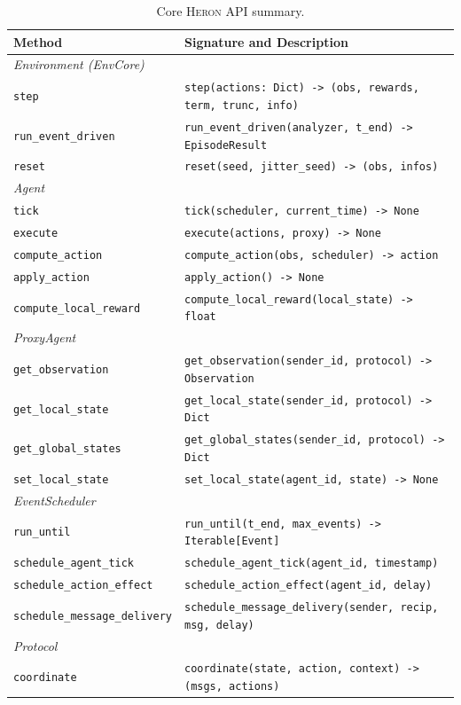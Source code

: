 \documentclass{article}
\newcommand{\heron}{\textsc{Heron}}
\begin{document}
\begin{table}[h]
\centering
\caption{Core \heron{} API summary.}
\label{tab:api}
\small
\begin{tabular}{@{}lp{8.5cm}@{}}
\toprule
\textbf{Method} & \textbf{Signature and Description} \\
\midrule
\multicolumn{2}{l}{\textit{Environment (EnvCore)}} \\
\texttt{step} & \texttt{step(actions: Dict) -> (obs, rewards, term, trunc, info)} \\
\texttt{run\_event\_driven} & \texttt{run\_event\_driven(analyzer, t\_end) -> EpisodeResult} \\
\texttt{reset} & \texttt{reset(seed, jitter\_seed) -> (obs, infos)} \\
\midrule
\multicolumn{2}{l}{\textit{Agent}} \\
\texttt{tick} & \texttt{tick(scheduler, current\_time) -> None} \\
\texttt{execute} & \texttt{execute(actions, proxy) -> None} \\
\texttt{compute\_action} & \texttt{compute\_action(obs, scheduler) -> action} \\
\texttt{apply\_action} & \texttt{apply\_action() -> None} \\
\texttt{compute\_local\_reward} & \texttt{compute\_local\_reward(local\_state) -> float} \\
\midrule
\multicolumn{2}{l}{\textit{ProxyAgent}} \\
\texttt{get\_observation} & \texttt{get\_observation(sender\_id, protocol) -> Observation} \\
\texttt{get\_local\_state} & \texttt{get\_local\_state(sender\_id, protocol) -> Dict} \\
\texttt{get\_global\_states} & \texttt{get\_global\_states(sender\_id, protocol) -> Dict} \\
\texttt{set\_local\_state} & \texttt{set\_local\_state(agent\_id, state) -> None} \\
\midrule
\multicolumn{2}{l}{\textit{EventScheduler}} \\
\texttt{run\_until} & \texttt{run\_until(t\_end, max\_events) -> Iterable[Event]} \\
\texttt{schedule\_agent\_tick} & \texttt{schedule\_agent\_tick(agent\_id, timestamp)} \\
\texttt{schedule\_action\_effect} & \texttt{schedule\_action\_effect(agent\_id, delay)} \\
\texttt{schedule\_message\_delivery} & \texttt{schedule\_message\_delivery(sender, recip, msg, delay)} \\
\midrule
\multicolumn{2}{l}{\textit{Protocol}} \\
\texttt{coordinate} & \texttt{coordinate(state, action, context) -> (msgs, actions)} \\
\bottomrule
\end{tabular}
\end{table}
\end{document}
